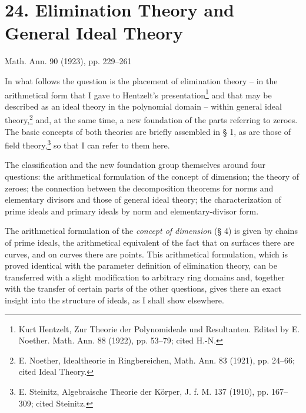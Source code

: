 \documentclass[11pt]{article}
\begin{document}
\setcounter{footnote}{0}

\section*{24. Elimination Theory and General Ideal Theory}
\begin{center}
Math. Ann. 90 (1923), pp. 229--261
\end{center}

In what follows the question is the placement of elimination theory -- in the arithmetical form that I gave to Hentzelt's presentation\footnote{Kurt Hentzelt, Zur Theorie der Polynomideale und Resultanten. Edited by E. Noether. Math. Ann. 88 (1922), pp. 53--79; cited H.-N.} and that may be described as an ideal theory in the polynomial domain -- within general ideal theory,\footnote{E. Noether, Idealtheorie in Ringbereichen, Math. Ann. 83 (1921), pp. 24--66; cited Ideal Theory.} and, at the same time, a new foundation of the parts referring to zeroes. The basic concepts of both theories are briefly assembled in § 1, as are those of field theory,\footnote{E. Steinitz, Algebraische Theorie der Körper, J. f. M. 137 (1910), pp. 167--309; cited Steinitz.} so that I can refer to them here.

The classification and the new foundation group themselves around four questions: the arithmetical formulation of the concept of dimension; the theory of zeroes; the connection between the decomposition theorems for norms and elementary divisors and those of general ideal theory; the characterization of prime ideals and primary ideals by norm and elementary-divisor form.

The arithmetical formulation of the \emph{concept of dimension} (§ 4) is given by chains of prime ideals, the arithmetical equivalent of the fact that on surfaces there are curves, and on curves there are points. This arithmetical formulation, which is proved identical with the parameter definition of elimination theory, can be transferred with a slight modification to arbitrary ring domains and, together with the transfer of certain parts of the other questions, gives there an exact insight into the structure of ideals, as I shall show elsewhere.
\end{document}
